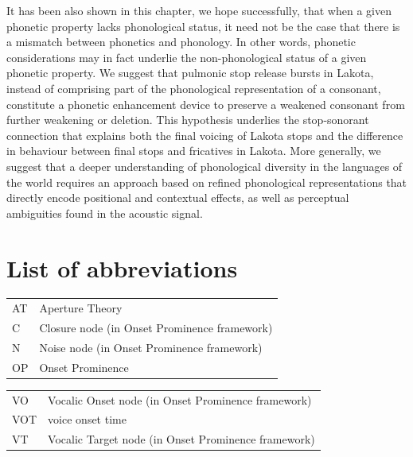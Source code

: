 \documentclass[output=paper]{langscibook}
\begin{document}
It has been also shown in this chapter, we hope successfully, that when a given phonetic property lacks phonological status, it need not be the case that there is a mismatch between phonetics and phonology. In other words, phonetic considerations may in fact underlie the non-phonological status of a given phonetic property. We suggest that pulmonic stop release bursts in Lakota, instead of comprising part of the phonological representation of a consonant, constitute a phonetic enhancement device to preserve a weakened consonant from further weakening or deletion. This hypothesis underlies the stop-sonorant connection that explains both the final voicing of Lakota stops and the difference in behaviour between final stops and fricatives in Lakota.  More generally, we suggest that a deeper understanding of phonological diversity in the languages of the world requires an approach based on refined phonological representations that directly encode positional and contextual effects, as well as perceptual ambiguities found in the acoustic signal. 

\section*{List of abbreviations}
\begin{tabularx}{.5\textwidth}[t]{@{}lQ}
AT  &  Aperture Theory\\
C  &  Closure node (in Onset Prominence framework)\\
N  &  Noise node (in Onset Prominence framework)\\
OP  &  Onset Prominence\\
\end{tabularx}%
\begin{tabularx}{.5\textwidth}[t]{lQ@{}}
VO  &  Vocalic Onset node (in Onset Prominence framework)\\
VOT  &  voice onset time\\
VT  &  Vocalic Target node (in Onset Prominence framework)\\
\end{tabularx}

\printbibliography[heading=subbibliography,notkeyword=this]
\end{document}
